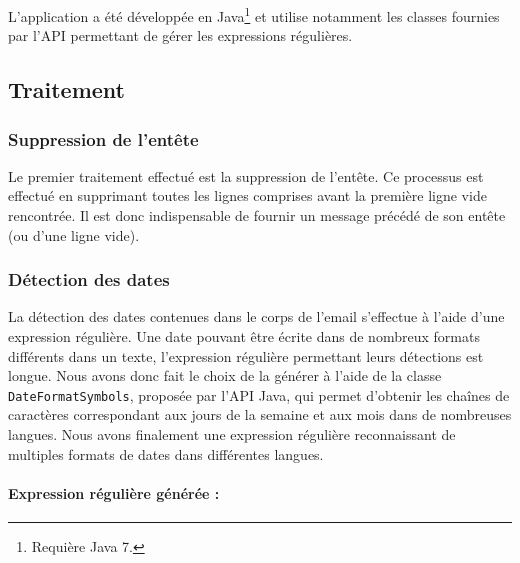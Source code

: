\documentclass[a4paper,french,10pt]{article}
\begin{document}
L'application a été développée en Java\footnote{Requière Java 7.} et utilise notamment les classes fournies par l'API permettant de gérer les expressions régulières.

\subsection{Traitement}

\subsubsection{Suppression de l'entête}
Le premier traitement effectué est la suppression de l'entête. Ce processus est effectué en supprimant toutes les lignes comprises avant la première ligne vide rencontrée. Il est donc indispensable de fournir un message précédé de son entête (ou d'une ligne vide).

\subsubsection{Détection des dates}
La détection des dates contenues dans le corps de l'email s'effectue à l'aide d'une expression régulière. Une date pouvant être écrite dans de nombreux formats différents dans un texte, l'expression régulière permettant leurs détections est longue. Nous avons donc fait le choix de la générer à l'aide de la classe \texttt{DateFormatSymbols}, proposée par l'API Java, qui permet d'obtenir les chaînes de caractères correspondant aux jours de la semaine et aux mois dans de nombreuses langues. Nous avons finalement une expression régulière reconnaissant de multiples formats de dates dans différentes langues.

\paragraph*{Expression régulière générée :}
\end{document}
